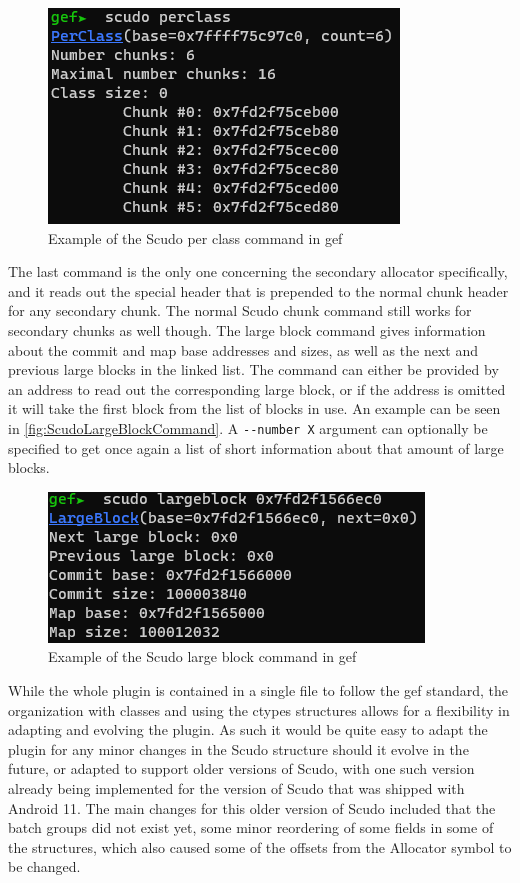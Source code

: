 \documentclass[a4paper,11pt,oneside]{report}
\begin{document}
\begin{figure}[h!]
  \centering
  \includegraphics{figures/ScudoPerClassCommand.png}
  \caption{Example of the Scudo per class command in gef}
  \label{fig:ScudoPerClassCommand}
\end{figure}

The last command is the only one concerning the secondary allocator specifically,
and it reads out the special header that is prepended to the normal chunk header
for any secondary chunk. The normal Scudo chunk command still works for secondary
chunks as well though. The large block command gives information about the
commit and map base addresses and sizes, as well as the next and previous large
blocks in the linked list. The command can either be provided by an address
to read out the corresponding large block, or if the address is omitted it will
take the first block from the list of blocks in use. An example can be seen in
\autoref{fig:ScudoLargeBlockCommand}. A \verb|--number X| argument can optionally be
specified to get once again a list of short information about that amount of large
blocks.

\begin{figure}[h!]
  \centering
  \includegraphics{figures/ScudoLargeBlockCommand.png}
  \caption{Example of the Scudo large block command in gef}
  \label{fig:ScudoLargeBlockCommand}
\end{figure}

While the whole plugin is contained in a single file to follow the gef standard,
the organization with classes and using the ctypes structures allows for a
flexibility in adapting and evolving the plugin. As such it would be quite
easy to adapt the plugin for any minor changes in the Scudo structure should
it evolve in the future, or adapted to support older versions of Scudo, with
one such version already being implemented for the version of Scudo that was
shipped with Android 11. The main changes for this older version of Scudo
included that the batch groups did not exist yet, some minor reordering of
some fields in some of the structures, which also caused some of the offsets
from the Allocator symbol to be changed.
\end{document}
